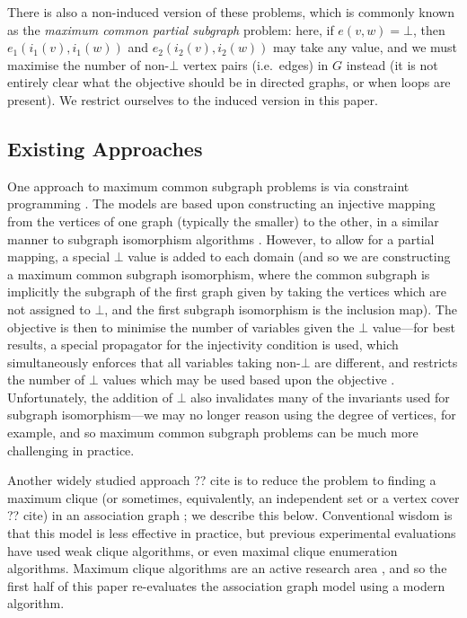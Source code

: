 \documentclass{llncs}
\begin{document}
There is also a non-induced version of these problems, which is commonly known as the \emph{maximum
common partial subgraph} problem: here, if $e(v, w) = \bot$, then $e_1(i_1(v), i_1(w))$ and
$e_2(i_2(v), i_2(w))$ may take any value, and we must maximise the number of non-$\bot$ vertex pairs
(i.e.\ edges) in $G$ instead (it is not entirely clear what the objective should be in directed
graphs, or when loops are present). We restrict ourselves to the induced version in this paper.

\subsection{Existing Approaches}

One approach to maximum common subgraph problems is via constraint programming
\cite{DBLP:conf/mco/VismaraV08,DBLP:conf/cp/NdiayeS11}. The models are based upon constructing an
injective mapping from the vertices of one graph (typically the smaller) to the other, in a similar
manner to subgraph isomorphism algorithms
\cite{DBLP:journals/ai/Solnon10,DBLP:conf/cp/AudemardLMGP14,DBLP:conf/cp/McCreeshP15}. However, to
allow for a partial mapping, a special $\bot$ value is added to each domain (and so we are
constructing a maximum common subgraph isomorphism, where the common subgraph is implicitly the
subgraph of the first graph given by taking the vertices which are not assigned to $\bot$, and the
first subgraph isomorphism is the inclusion map). The objective is then to minimise the number of
variables given the $\bot$ value---for best results, a special propagator for the injectivity
condition is used, which simultaneously enforces that all variables taking non-$\bot$ are different,
and restricts the number of $\bot$ values which may be used based upon the objective
\cite{DBLP:conf/cp/PetitRB01}.  Unfortunately, the addition of $\bot$ also invalidates many of the
invariants used for subgraph isomorphism---we may no longer reason using the degree of vertices, for
example, and so maximum common subgraph problems can be much more challenging in practice.

Another widely studied approach ?? cite is to reduce the problem to finding a maximum clique (or sometimes,
equivalently, an independent set or a vertex cover ?? cite) in an association graph \cite{LeviG}; we describe
this below. Conventional wisdom is that this model is less effective in practice, but previous
experimental evaluations have used weak clique algorithms, or even maximal clique enumeration
algorithms. Maximum clique algorithms are an active research area
\cite{DBLP:conf/dmtcs/TomitaS03,DBLP:journals/jgo/TomitaK07,DBLP:conf/walcom/TomitaSHTW10,DBLP:journals/cor/SegundoRJ11,DBLP:journals/algorithms/Prosser12,DBLP:journals/ol/SegundoMRH13,DBLP:conf/ictai/LiFX13,DBLP:journals/cor/SegundoT14,DBLP:conf/lion/SegundoLB14,DBLP:conf/cp/McCreeshP14,DBLP:journals/jco/BatsynGMP14,DBLP:journals/cor/SegundoNB15,DBLP:conf/lion/NikolaevBS15,DBLP:conf/lion/LiJX15,DBLP:journals/jcc/KoncDTRJ12,DBLP:journals/algorithms/McCreeshP13,DBLP:journals/topc/McCreeshP15,DBLP:journals/cor/SegundoLP16},
and so the first half of this paper re-evaluates the association graph model using a modern
algorithm.
\end{document}
